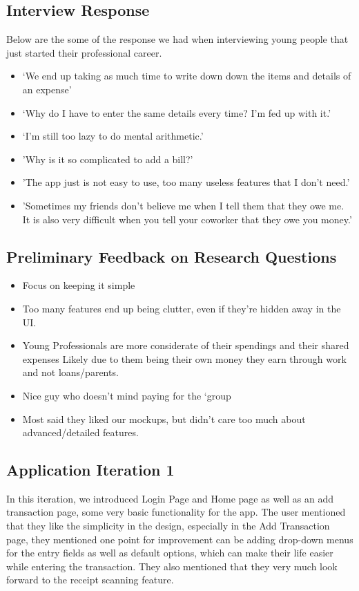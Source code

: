 \documentclass[a4wide, 10pt]{article}
\begin{document}
\subsection{Interview Response}
\label{intRes}
Below are the some of the response we had when interviewing young people that just started their professional career.

\begin{itemize}
  \item ‘We end up taking as much time to write down down the items and details of an expense’
  \item ‘Why do I have to enter the same details every time? I'm fed up with it.’
  \item ‘I’m still too lazy to do mental arithmetic.’
  \item 'Why is it so complicated to add a bill?'
  \item 'The app just is not easy to use, too many useless features that I don't need.'
  \item 'Sometimes my friends don't believe me when I tell them that they owe me. It is also very difficult when you tell your coworker that they owe you money.'
\end{itemize}

\subsection{Preliminary Feedback on Research Questions}
\label{feedback}
\begin{itemize}
  \item Focus on keeping it simple
  \item Too many features end up being clutter, even if they’re hidden away in the UI.
  \item Young Professionals are more considerate of their spendings and their shared expenses
Likely due to them being their own money they earn through work and not loans/parents.
  \item Nice guy who doesn’t mind paying for the `group
  \item Most said they liked our mockups, but didn’t care too much about advanced/detailed features.
\end{itemize}

\subsection{Application Iteration 1}

In this iteration, we introduced Login Page and Home page as well as an add transaction page, some very basic functionality for the app. The user mentioned that they like the simplicity in the design, especially in the Add Transaction page, they mentioned one point for improvement can be adding drop-down menus for the entry fields as well as default options, which can make their life easier while entering the transaction. They also mentioned that they very much look forward to the receipt scanning feature.
\end{document}

